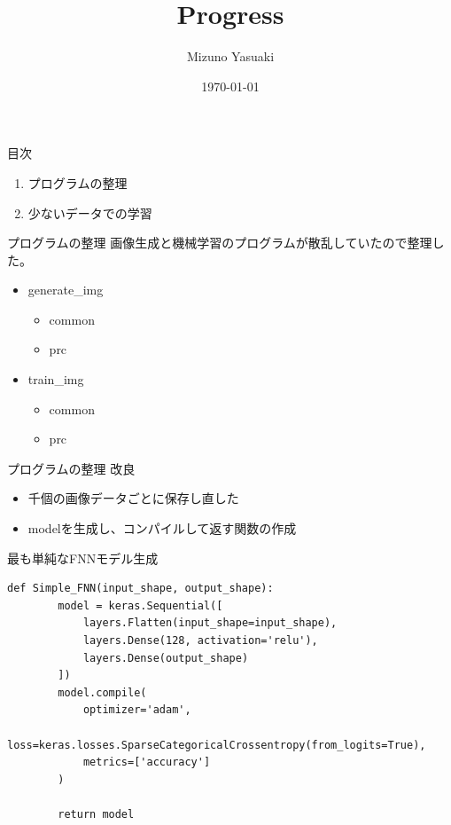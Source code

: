 \documentclass[dvipdfmx]{beamer}
\title{Progress}
\date{\today}
\author{Mizuno Yasuaki}
\begin{document}
  \maketitle
  
  \begin{frame}{目次}
    \begin{enumerate}
      \item プログラムの整理
      \item 少ないデータでの学習
    \end{enumerate}
  \end{frame}

  \begin{frame}{プログラムの整理}
    画像生成と機械学習のプログラムが散乱していたので整理した。
    \begin{itemize}
      \item generate\_img
      \begin{itemize}
        \item common
        \item prc
      \end{itemize}
      \item train\_img
      \begin{itemize}
        \item common
        \item prc
      \end{itemize}
    \end{itemize}
  \end{frame}

  \begin{frame}{プログラムの整理}
    改良
    \begin{itemize}
      \item 千個の画像データごとに保存し直した
      \item modelを生成し、コンパイルして返す関数の作成
    \end{itemize}
  \end{frame}

  \begin{frame}[fragile]{最も単純なFNNモデル生成}
    \begin{lstlisting}[caption=Simple\_FNN.py]
      def Simple_FNN(input_shape, output_shape):
        model = keras.Sequential([
            layers.Flatten(input_shape=input_shape),
            layers.Dense(128, activation='relu'),
            layers.Dense(output_shape)
        ])
        model.compile(
            optimizer='adam',
            loss=keras.losses.SparseCategoricalCrossentropy(from_logits=True),
            metrics=['accuracy']
        )
    
        return model
    \end{lstlisting}
  \end{frame}
\end{document}
